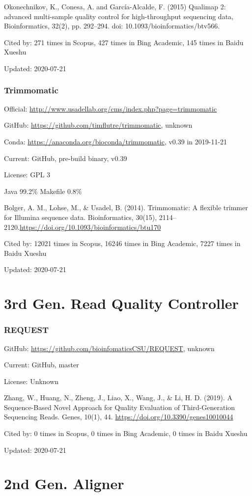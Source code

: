 \documentclass[]{article}
\newcommand{\cb}[3]{\par Cited by: {\color{blue}\Huge #1} times in Scopus, {\color{blue}\Huge #2} times in Bing Academic, {\color{blue}\Huge #3} times in Baidu Xueshu}
\begin{document}
Okonechnikov, K., Conesa, A. and García-Alcalde, F. (2015) Qualimap 2: advanced multi-sample quality control for high-throughput sequencing data, Bioinformatics, 32(2), pp. 292–294. doi: 10.1093/bioinformatics/btv566.\cb{271}{427}{145}

Updated: 2020-07-21

\section{Trimmomatic}

Official: \url{http://www.usadellab.org/cms/index.php?page=trimmomatic}

GitHub: \url{https://github.com/timflutre/trimmomatic}, unknown

Conda: \url{https://anaconda.org/bioconda/trimmomatic}, v0.39 in 2019-11-21

Current: GitHub, pre-build binary, v0.39

License: GPL 3

Java 99.2\% Makefile 0.8\%

Bolger, A. M., Lohse, M., \& Usadel, B. (2014). Trimmomatic: A flexible trimmer for Illumina sequence data. Bioinformatics, 30(15), 2114–2120.\url{https://doi.org/10.1093/bioinformatics/btu170} \cb{12021}{16246}{7227}

Updated: 2020-07-21

\part{3rd Gen. Read Quality Controller}

\section{REQUEST}

GitHub: \url{https://github.com/bioinfomaticsCSU/REQUEST}, unknown

Current: GitHub, master

License: Unknown

Zhang, W., Huang, N., Zheng, J., Liao, X., Wang, J., \& Li, H. D. (2019). A Sequence-Based Novel Approach for Quality Evaluation of Third-Generation Sequencing Reads. Genes, 10(1), 44. \url{https://doi.org/10.3390/genes10010044}\cb{0}{0}{0}

Updated: 2020-07-21

\part{2nd Gen. Aligner}
\end{document}
